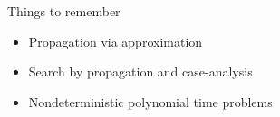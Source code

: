 \begin{frame}{Things to remember}
  \bigskip
  \begin{itemize}
  \item Propagation via approximation
    \smallskip
  \item Search by propagation and case-analysis
    \smallskip
  \item Nondeterministic polynomial time problems
  \end{itemize}
\end{frame}
%
